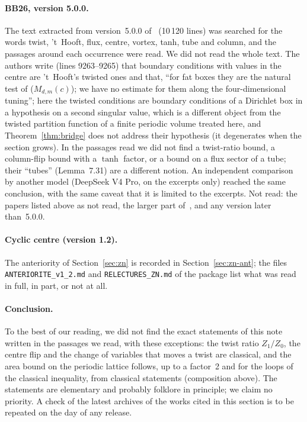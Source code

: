 \documentclass[11pt,a4paper]{article}
\theoremstyle{plain}
\theoremstyle{definition}
\theoremstyle{remark}
\numberwithin{equation}{section}
\begin{document}
\paragraph{BB26, version 5.0.0.} The text extracted from version~5.0.0 of~\cite{BB26} (10\,120 lines) was searched for the words twist, 't~Hooft, flux, centre, vortex, tanh, tube and column, and the passages around each occurrence were read. We did not read the whole text. The authors write (lines 9263--9265) that boundary conditions with values in the centre are 't~Hooft's twisted ones and that, ``for fat boxes they are the natural test of ($M_{d,m}(c)$); we have no estimate for them along the four-dimensional tuning''; here the twisted conditions are boundary conditions of a Dirichlet box in a hypothesis on a second singular value, which is a different object from the twisted partition function of a finite periodic volume treated here, and Theorem~\ref{thm:bridge} does not address their hypothesis (it degenerates when the section grows). In the passages read we did not find a twist-ratio bound, a column-flip bound with a $\tanh$ factor, or a bound on a flux sector of a tube; their ``tubes'' (Lemma~7.31) are a different notion. An independent comparison by another model (DeepSeek V4 Pro, on the excerpts only) reached the same conclusion, with the same caveat that it is limited to the excerpts. Not read: the papers listed above as not read, the larger part of~\cite{BB26}, and any version later than~5.0.0.

\paragraph{Cyclic centre (version 1.2).} The anteriority of Section~\ref{sec:zn} is recorded in Section~\ref{sec:zn-ant}; the files \texttt{ANTERIORITE\_v1\_2.md} and \texttt{RELECTURES\_ZN.md} of the package list what was read in full, in part, or not at all.\paragraph{Conclusion.} To the best of our reading, we did not find the exact statements of this note written in the passages we read, with these exceptions: the twist ratio $Z_1/Z_0$, the centre flip and the change of variables that moves a twist are classical, and the area bound on the periodic lattice follows, up to a factor~2 and for the loops of the classical inequality, from classical statements (composition above). The statements are elementary and probably folklore in principle; we claim no priority. A check of the latest archives of the works cited in this section is to be repeated on the day of any release.
\end{document}
